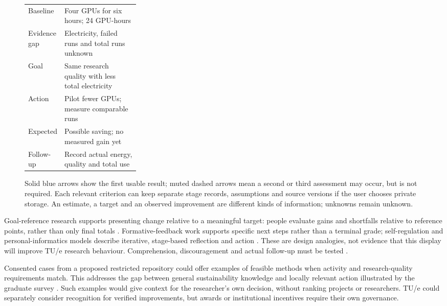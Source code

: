 \documentclass[11pt,a4paper]{article}
\begin{document}
\begin{figure}[!htbp]
\begin{minipage}[t]{0.53\textwidth}
\begin{tabularx}{\linewidth}{@{}>{\raggedright\arraybackslash}p{0.28\linewidth}>{\raggedright\arraybackslash}X@{}}
\midrule
Baseline & Four GPUs for six hours; 24 GPU-hours \\
Evidence gap & Electricity, failed runs and total runs unknown \\
Goal & Same research quality with less total electricity \\
Action & Pilot fewer GPUs; measure comparable runs \\
Expected & Possible saving; no measured gain yet \\
Follow-up & Record actual energy, quality and total use \\
\bottomrule
\end{tabularx}
\end{minipage}
\caption{Solid blue arrows show the first usable result; muted dashed arrows mean a second or third assessment may occur, but is not required. Each relevant criterion can keep separate stage records, assumptions and source versions if the user chooses private storage. An estimate, a target and an observed improvement are different kinds of information; unknowns remain unknown.}
\label{fig:start-shift-loop}
\end{figure}
Goal-reference research supports presenting change relative to a meaningful target: people evaluate gains and shortfalls relative to reference points, rather than only final totals \citep{kahneman1979prospect,heath1999goals}. Formative-feedback work supports specific next steps rather than a terminal grade; self-regulation and personal-informatics models describe iterative, stage-based reflection and action \citep{shute2008feedback,zimmerman2002self,li2010stages}. These are design analogies, not evidence that this display will improve TU/e research behaviour. Comprehension, discouragement and actual follow-up must be tested \citep{carver1982control,hattie2007feedback}.

Consented cases from a proposed restricted repository could offer examples of feasible methods when activity and research-quality requirements match. This addresses the gap between general sustainability knowledge and locally relevant action illustrated by the graduate survey \citep{shiekh2026graduate}. Such examples would give context for the researcher's own decision, without ranking projects or researchers. TU/e could separately consider recognition for verified improvements, but awards or institutional incentives require their own governance.
\end{document}
